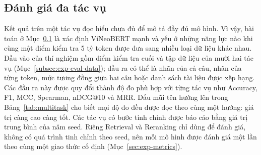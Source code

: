 \subsection{Đánh giá đa tác vụ}
\label{subsec:exp-multitask}

Kết quả trên một tác vụ đọc hiểu chưa đủ để mô tả đầy đủ mô hình. Vì vậy, bài toán ở
Mục~\ref{subsec:exp-multitask} là xác định ViNeoBERT mạnh và yếu ở những năng lực nào khi
cùng một điểm kiểm tra 5 tỷ token được đưa sang nhiều loại dữ liệu khác nhau. Đầu vào
của thí nghiệm gồm điểm kiểm tra cuối và tập dữ liệu của mười hai tác vụ
(Mục~\ref{subsec:exp-eval-data}); đầu ra có thể là nhãn của cả câu, nhãn của từng token,
mức tương đồng giữa hai câu hoặc danh sách tài liệu được xếp hạng. Các đầu ra này được
quy đổi thành độ đo phù hợp với từng tác vụ như Accuracy, F1, MCC, Spearman, nDCG@10 và
MRR. Dấu mũi tên hướng lên trong Bảng~\ref{tab:multitask} cho biết mọi độ đo đều được
đọc theo cùng một hướng: giá trị càng cao càng tốt. Các tác vụ có bước tinh chỉnh được
báo cáo bằng giá trị trung bình của năm seed. Riêng Retrieval và Reranking chỉ dùng để
đánh giá, không có quá trình tinh chỉnh theo seed, nên mỗi mô hình được đánh giá một lần
theo cùng một giao thức cố định (Mục~\ref{sec:exp-metrics}).

